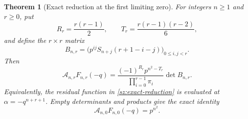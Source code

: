 \documentclass[11pt]{article}
\numberwithin{equation}{section}
\newtheorem{theorem}{Theorem}[section]
\theoremstyle{definition}
\theoremstyle{remark}
\begin{document}
\begin{theorem}[Exact reduction at the first limiting zero]
\label{sz:reduction}
For integers $n\ge1$ and $r\ge0$, put
\[
 R_r=\frac{r(r-1)}2,\qquad T_r=\frac{r(r-1)(r-2)}6,
\]
and define the $r\times r$ matrix
\begin{equation}\label{sz:def-B}
 B_{n,r}=\bigl(p^{ij}S_{n+j}(r+1-i-j)\bigr)_{0\le i,j<r}.
\end{equation}
Then
\begin{equation}\label{sz:exact-reduction}
 \boxed{
 \mathcal A_{n,r}F_{n,r}(-q)
 =\frac{(-1)^{R_r}p^{n^2-T_r}}
 {\prod_{i=0}^{r-1}\pi_i}\det B_{n,r}.}
\end{equation}
Equivalently, the residual function in \eqref{sz:exact-reduction} is
evaluated at $\alpha=-q^{n+r+1}$.  Empty determinants and products give
the exact identity
\begin{equation}\label{sz:unshifted-special-value}
 \mathcal A_{n,0}F_{n,0}(-q)=p^{n^2}.
\end{equation}
\end{theorem}
\end{document}
